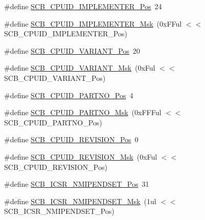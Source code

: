 \begin{DoxyCompactItemize}
\item 
\#define \mbox{\hyperlink{group___c_m_s_i_s___c_m3___s_c_b_ga58686b88f94f789d4e6f429fe1ff58cf}{S\+C\+B\+\_\+\+C\+P\+U\+I\+D\+\_\+\+I\+M\+P\+L\+E\+M\+E\+N\+T\+E\+R\+\_\+\+Pos}}~24
\item 
\#define \mbox{\hyperlink{group___c_m_s_i_s___c_m3___s_c_b_ga0932b31faafd47656a03ced75a31d99b}{S\+C\+B\+\_\+\+C\+P\+U\+I\+D\+\_\+\+I\+M\+P\+L\+E\+M\+E\+N\+T\+E\+R\+\_\+\+Msk}}~(0x\+F\+Ful $<$$<$ S\+C\+B\+\_\+\+C\+P\+U\+I\+D\+\_\+\+I\+M\+P\+L\+E\+M\+E\+N\+T\+E\+R\+\_\+\+Pos)
\item 
\#define \mbox{\hyperlink{group___c_m_s_i_s___c_m3___s_c_b_ga104462bd0815391b4044a70bd15d3a71}{S\+C\+B\+\_\+\+C\+P\+U\+I\+D\+\_\+\+V\+A\+R\+I\+A\+N\+T\+\_\+\+Pos}}~20
\item 
\#define \mbox{\hyperlink{group___c_m_s_i_s___c_m3___s_c_b_gad358dfbd04300afc1824329d128b99e8}{S\+C\+B\+\_\+\+C\+P\+U\+I\+D\+\_\+\+V\+A\+R\+I\+A\+N\+T\+\_\+\+Msk}}~(0x\+Ful $<$$<$ S\+C\+B\+\_\+\+C\+P\+U\+I\+D\+\_\+\+V\+A\+R\+I\+A\+N\+T\+\_\+\+Pos)
\item 
\#define \mbox{\hyperlink{group___c_m_s_i_s___c_m3___s_c_b_ga705f68eaa9afb042ca2407dc4e4629ac}{S\+C\+B\+\_\+\+C\+P\+U\+I\+D\+\_\+\+P\+A\+R\+T\+N\+O\+\_\+\+Pos}}~4
\item 
\#define \mbox{\hyperlink{group___c_m_s_i_s___c_m3___s_c_b_ga98e581423ca016680c238c469aba546d}{S\+C\+B\+\_\+\+C\+P\+U\+I\+D\+\_\+\+P\+A\+R\+T\+N\+O\+\_\+\+Msk}}~(0x\+F\+F\+Ful $<$$<$ S\+C\+B\+\_\+\+C\+P\+U\+I\+D\+\_\+\+P\+A\+R\+T\+N\+O\+\_\+\+Pos)
\item 
\#define \mbox{\hyperlink{group___c_m_s_i_s___c_m3___s_c_b_ga3c3d9071e574de11fb27ba57034838b1}{S\+C\+B\+\_\+\+C\+P\+U\+I\+D\+\_\+\+R\+E\+V\+I\+S\+I\+O\+N\+\_\+\+Pos}}~0
\item 
\#define \mbox{\hyperlink{group___c_m_s_i_s___c_m3___s_c_b_ga2ec0448b6483f77e7f5d08b4b81d85df}{S\+C\+B\+\_\+\+C\+P\+U\+I\+D\+\_\+\+R\+E\+V\+I\+S\+I\+O\+N\+\_\+\+Msk}}~(0x\+Ful $<$$<$ S\+C\+B\+\_\+\+C\+P\+U\+I\+D\+\_\+\+R\+E\+V\+I\+S\+I\+O\+N\+\_\+\+Pos)
\item 
\#define \mbox{\hyperlink{group___c_m_s_i_s___c_m3___s_c_b_ga750d4b52624a46d71356db4ea769573b}{S\+C\+B\+\_\+\+I\+C\+S\+R\+\_\+\+N\+M\+I\+P\+E\+N\+D\+S\+E\+T\+\_\+\+Pos}}~31
\item 
\#define \mbox{\hyperlink{group___c_m_s_i_s___c_m3___s_c_b_ga340e3f79e9c3607dee9f2c048b6b22e8}{S\+C\+B\+\_\+\+I\+C\+S\+R\+\_\+\+N\+M\+I\+P\+E\+N\+D\+S\+E\+T\+\_\+\+Msk}}~(1ul $<$$<$ S\+C\+B\+\_\+\+I\+C\+S\+R\+\_\+\+N\+M\+I\+P\+E\+N\+D\+S\+E\+T\+\_\+\+Pos)
$$
\end{DoxyCompactItemize}
